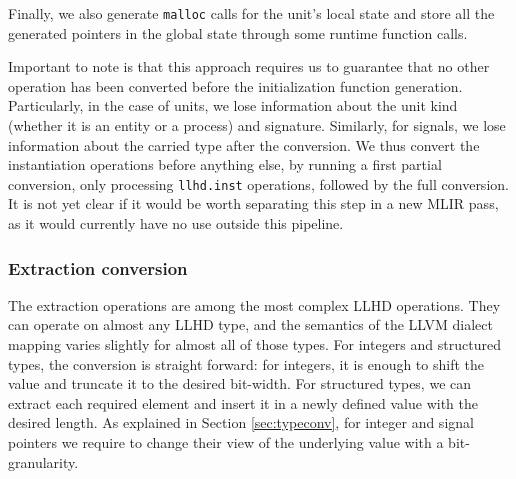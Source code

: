 Finally, we also generate \texttt{malloc} calls for the unit's local state and store all the generated pointers in the global state through some runtime function calls.

Important to note is that this approach requires us to guarantee that no other operation has been converted before the initialization function generation. Particularly, in the case of units, we lose information about the unit kind (whether it is an entity or a process) and signature. Similarly, for signals, we lose information about the carried type after the conversion. We thus convert the instantiation operations before anything else, by running a first partial conversion, only processing \texttt{llhd.inst} operations, followed by the full conversion. It is not yet clear if it would be worth separating this step in a new MLIR pass, as it would currently have no use outside this pipeline.

\subsubsection{Extraction conversion}
\label{sec:extrs}
The extraction operations are among the most complex LLHD operations. They can operate on almost any LLHD type, and the semantics of the LLVM dialect mapping varies slightly for almost all of those types. For integers and structured types, the conversion is straight forward: for integers, it is enough to shift the value and truncate it to the desired bit-width. For structured types, we can extract each required element and insert it in a newly defined value with the desired length. As explained in Section \ref{sec:typeconv}, for integer and signal pointers we require to change their view of the underlying value with a bit-granularity.



